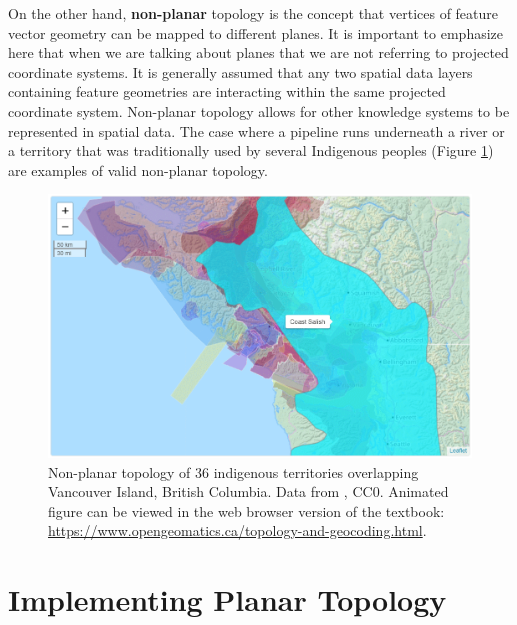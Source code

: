 \documentclass[
]{book}
\begin{document}
On the other hand, \textbf{non-planar} topology is the concept that vertices of feature vector geometry can be mapped to different planes. It is important to emphasize here that when we are talking about planes that we are not referring to projected coordinate systems. It is generally assumed that any two spatial data layers containing feature geometries are interacting within the same projected coordinate system. Non-planar topology allows for other knowledge systems to be represented in spatial data. The case where a pipeline runs underneath a river or a territory that was traditionally used by several Indigenous peoples (Figure \ref{fig:7-native-land-leaflet}) are examples of valid non-planar topology.





\begin{figure}
\includegraphics[width=1\linewidth]{images/07-native-land-leaflet} \caption{Non-planar topology of 36 indigenous territories overlapping Vancouver Island, British Columbia. Data from \citet{native_land_native_nodate}, CC0. Animated figure can be viewed in the web browser version of the textbook: \url{https://www.opengeomatics.ca/topology-and-geocoding.html}.}\label{fig:7-native-land-leaflet}
\end{figure}

\section{Implementing Planar Topology}\label{implementing-planar-topology}
\end{document}

